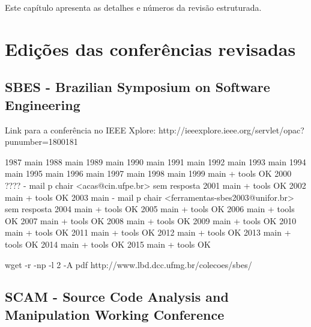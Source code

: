 {Este capítulo apresenta as detalhes e números da revisão estruturada.}
\label{apendice-revisao-estruturada}

\section{Edições das conferências revisadas}
\label{edicoes-conferencias}

\subsection{SBES - Brazilian Symposium on Software Engineering}

Link para a conferência no IEEE Xplore: http://ieeexplore.ieee.org/servlet/opac?punumber=1800181 

1987 main
1988 main
1989 main
1990 main
1991 main
1992 main
1993 main
1994 main
1995 main
1996 main
1997 main
1998 main
1999 main + tools OK
2000 ???? - mail p chair <acas@cin.ufpe.br> sem resposta 
2001 main + tools OK
2002 main + tools OK
2003 main - mail p chair <ferramentas-sbes2003@unifor.br> sem resposta
2004 main + tools OK
2005 main + tools OK
2006 main + tools OK
2007 main + tools OK
2008 main + tools OK
2009 main + tools OK
2010 main + tools OK
2011 main + tools OK
2012 main + tools OK
2013 main + tools OK
2014 main + tools OK
2015 main + tools OK

wget -r -np -l 2 -A pdf http://www.lbd.dcc.ufmg.br/colecoes/sbes/


\subsection{SCAM - Source Code Analysis and Manipulation Working Conference}

